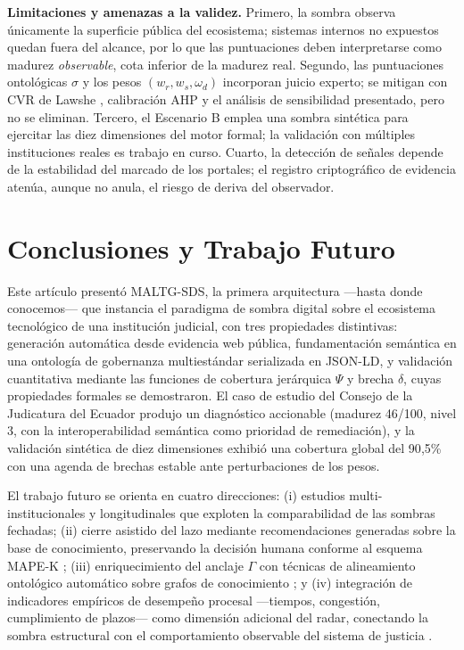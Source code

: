 \documentclass[computers,article,submit,pdftex,moreauthors]{Definitions/mdpi}
\begin{document}
\textbf{Limitaciones y amenazas a la validez.} Primero, la sombra observa únicamente la superficie pública del ecosistema; sistemas internos no expuestos quedan fuera del alcance, por lo que las puntuaciones deben interpretarse como madurez \emph{observable}, cota inferior de la madurez real. Segundo, las puntuaciones ontológicas $\sigma$ y los pesos $(w_r, w_s, \omega_d)$ incorporan juicio experto; se mitigan con CVR de Lawshe \cite{Lawshe1975}, calibración AHP \cite{Saaty1990} y el análisis de sensibilidad presentado, pero no se eliminan. Tercero, el Escenario B emplea una sombra sintética para ejercitar las diez dimensiones del motor formal; la validación con múltiples instituciones reales es trabajo en curso. Cuarto, la detección de señales depende de la estabilidad del marcado de los portales; el registro criptográfico de evidencia atenúa, aunque no anula, el riesgo de deriva del observador.

\section{Conclusiones y Trabajo Futuro}
\label{sec:conclusions}

Este artículo presentó MALTG-SDS, la primera arquitectura —hasta donde conocemos— que instancia el paradigma de sombra digital sobre el ecosistema tecnológico de una institución judicial, con tres propiedades distintivas: generación automática desde evidencia web pública, fundamentación semántica en una ontología de gobernanza multiestándar serializada en JSON-LD, y validación cuantitativa mediante las funciones de cobertura jerárquica $\Psi$ y brecha $\delta$, cuyas propiedades formales se demostraron. El caso de estudio del Consejo de la Judicatura del Ecuador produjo un diagnóstico accionable (madurez 46/100, nivel 3, con la interoperabilidad semántica como prioridad de remediación), y la validación sintética de diez dimensiones exhibió una cobertura global del 90{,}5\% con una agenda de brechas estable ante perturbaciones de los pesos.

El trabajo futuro se orienta en cuatro direcciones: (i) estudios multi-institucionales y longitudinales que exploten la comparabilidad de las sombras fechadas; (ii) cierre asistido del lazo mediante recomendaciones generadas sobre la base de conocimiento, preservando la decisión humana conforme al esquema MAPE-K \cite{Kephart2003}; (iii) enriquecimiento del anclaje $\Gamma$ con técnicas de alineamiento ontológico automático sobre grafos de conocimiento \cite{Hogan2021}; y (iv) integración de indicadores empíricos de desempeño procesal —tiempos, congestión, cumplimiento de plazos— como dimensión adicional del radar, conectando la sombra estructural con el comportamiento observable del sistema de justicia \cite{Medvedeva2020}.
\end{document}
